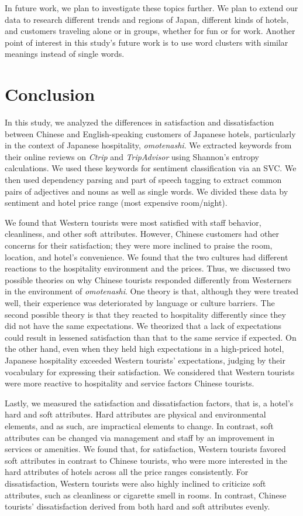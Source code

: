 \documentclass[smallextended,natbib]{svjour3}       %
\begin{document}
  In future work, we plan to investigate these topics further. We plan to extend our data to research different trends and regions of Japan, different kinds of hotels, and customers traveling alone or in groups, whether for fun or for work. Another point of interest in this study's future work is to use word clusters with similar meanings instead of single words. 

\section{Conclusion}\label{conclusion}

  In this study, we analyzed the differences in satisfaction and dissatisfaction between Chinese and English-speaking customers of Japanese hotels, particularly in the context of Japanese hospitality, \textit{omotenashi}. We extracted keywords from their online reviews on \textit{Ctrip} and \textit{TripAdvisor} using Shannon's entropy calculations. We used these keywords for sentiment classification via an SVC. We then used dependency parsing and part of speech tagging to extract common pairs of adjectives and nouns as well as single words. We divided these data by sentiment and hotel price range (most expensive room/night). 

  We found that Western tourists were most satisfied with staff behavior, cleanliness, and other soft attributes. However, Chinese customers had other concerns for their satisfaction; they were more inclined to praise the room, location, and hotel's convenience. We found that the two cultures had different reactions to the hospitality environment and the prices. Thus, we discussed two possible theories on why Chinese tourists responded differently from Westerners in the environment of \textit{omotenashi}. One theory is that, although they were treated well, their experience was deteriorated by language or culture barriers. The second possible theory is that they reacted to hospitality differently since they did not have the same expectations. We theorized that a lack of expectations could result in lessened satisfaction than that to the same service if expected. On the other hand, even when they held high expectations in a high-priced hotel, Japanese hospitality exceeded Western tourists’ expectations, judging by their vocabulary for expressing their satisfaction. We considered that Western tourists were more reactive to hospitality and service factors Chinese tourists.

  Lastly, we measured the satisfaction and dissatisfaction factors, that is, a hotel's hard and soft attributes. Hard attributes are physical and environmental elements, and as such, are impractical elements to change. In contrast, soft attributes can be changed via management and staff by an improvement in services or amenities. We found that, for satisfaction, Western tourists favored soft attributes in contrast to Chinese tourists, who were more interested in the hard attributes of hotels across all the price ranges consistently. For dissatisfaction, Western tourists were also highly inclined to criticize soft attributes, such as cleanliness or cigarette smell in rooms. In contrast, Chinese tourists' dissatisfaction derived from both hard and soft attributes evenly.
\end{document}
